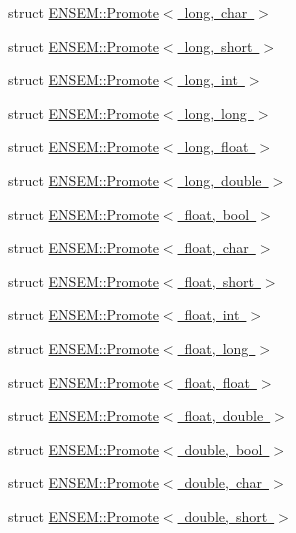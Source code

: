 \begin{DoxyCompactItemize}
\item 
struct \mbox{\hyperlink{structENSEM_1_1Promote_3_01long_00_01char_01_4}{E\+N\+S\+E\+M\+::\+Promote$<$ long, char $>$}}
\item 
struct \mbox{\hyperlink{structENSEM_1_1Promote_3_01long_00_01short_01_4}{E\+N\+S\+E\+M\+::\+Promote$<$ long, short $>$}}
\item 
struct \mbox{\hyperlink{structENSEM_1_1Promote_3_01long_00_01int_01_4}{E\+N\+S\+E\+M\+::\+Promote$<$ long, int $>$}}
\item 
struct \mbox{\hyperlink{structENSEM_1_1Promote_3_01long_00_01long_01_4}{E\+N\+S\+E\+M\+::\+Promote$<$ long, long $>$}}
\item 
struct \mbox{\hyperlink{structENSEM_1_1Promote_3_01long_00_01float_01_4}{E\+N\+S\+E\+M\+::\+Promote$<$ long, float $>$}}
\item 
struct \mbox{\hyperlink{structENSEM_1_1Promote_3_01long_00_01double_01_4}{E\+N\+S\+E\+M\+::\+Promote$<$ long, double $>$}}
\item 
struct \mbox{\hyperlink{structENSEM_1_1Promote_3_01float_00_01bool_01_4}{E\+N\+S\+E\+M\+::\+Promote$<$ float, bool $>$}}
\item 
struct \mbox{\hyperlink{structENSEM_1_1Promote_3_01float_00_01char_01_4}{E\+N\+S\+E\+M\+::\+Promote$<$ float, char $>$}}
\item 
struct \mbox{\hyperlink{structENSEM_1_1Promote_3_01float_00_01short_01_4}{E\+N\+S\+E\+M\+::\+Promote$<$ float, short $>$}}
\item 
struct \mbox{\hyperlink{structENSEM_1_1Promote_3_01float_00_01int_01_4}{E\+N\+S\+E\+M\+::\+Promote$<$ float, int $>$}}
\item 
struct \mbox{\hyperlink{structENSEM_1_1Promote_3_01float_00_01long_01_4}{E\+N\+S\+E\+M\+::\+Promote$<$ float, long $>$}}
\item 
struct \mbox{\hyperlink{structENSEM_1_1Promote_3_01float_00_01float_01_4}{E\+N\+S\+E\+M\+::\+Promote$<$ float, float $>$}}
\item 
struct \mbox{\hyperlink{structENSEM_1_1Promote_3_01float_00_01double_01_4}{E\+N\+S\+E\+M\+::\+Promote$<$ float, double $>$}}
\item 
struct \mbox{\hyperlink{structENSEM_1_1Promote_3_01double_00_01bool_01_4}{E\+N\+S\+E\+M\+::\+Promote$<$ double, bool $>$}}
\item 
struct \mbox{\hyperlink{structENSEM_1_1Promote_3_01double_00_01char_01_4}{E\+N\+S\+E\+M\+::\+Promote$<$ double, char $>$}}
\item 
struct \mbox{\hyperlink{structENSEM_1_1Promote_3_01double_00_01short_01_4}{E\+N\+S\+E\+M\+::\+Promote$<$ double, short $>$}}

\end{DoxyCompactItemize}
